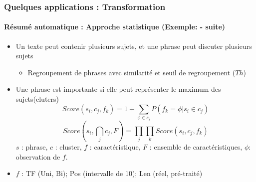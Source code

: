 \documentclass[xcolor=table]{beamer}
\begin{document}
\begin{frame}
	\frametitle{Quelques applications : Transformation}
	\framesubtitle{Résumé automatique : Approche statistique (Exemple: \cite{13-aries-al} - suite)}
	
	\begin{itemize}
		\item Un texte peut contenir plusieurs sujets, et une phrase peut discuter plusieurs sujets
		\begin{itemize}
			\item Regroupement de phrases avec similarité et seuil de regroupement ($Th$)
		\end{itemize}
		\item Une phrase est importante si elle peut représenter le maximum des sujets(cluters)
		\[ Score(s_i , c_j , f_k ) = 1 + \sum_{\phi \in s_i} {P(f_k=\phi | s_i \in c_j)} \]
		\[ Score(s_i , \bigcap_{j} c_j , F) =  %
		\prod_{j} \prod_{k} Score(s_i , c_j , f_k ) \]
		$ s $ : phrase, $ c $ : cluster, $ f $ : caractéristique, $ F $ : ensemble de caractéristiques, $ \phi $: observation de $ f $.
		\item $f$ : TF (Uni, Bi); Pos (intervalle de 10); Len (réel, pré-traité)
	\end{itemize}
	
\end{frame}
\end{document}
